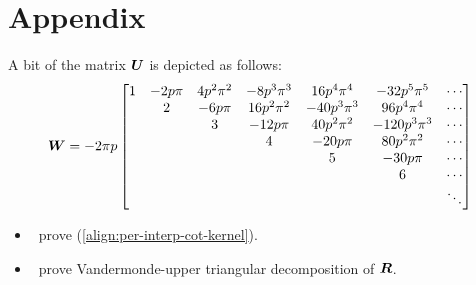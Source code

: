 \section{Appendix}

A bit of the matrix $\boldsymbol{U}$ is depicted as follows:
\begin{align}
  \label{eq:some-of-U}
  \boldsymbol{W} = -2\pi{}p \begin{bmatrix}
    1 & -2 p \pi  & 4 p^2 \pi ^2 & -8 p^3 \pi ^3 & 16 p^4 \pi ^4 & -32 p^5 \pi ^5 & \cdots \\
    & 2 & -6 p \pi  & 16 p^2 \pi ^2 & -40 p^3 \pi ^3 & 96 p^4 \pi ^4 & \cdots \\
    & & 3 & -12 p \pi  & 40 p^2 \pi ^2 & -120 p^3 \pi ^3 & \cdots \\
    & & & 4 & -20 p \pi  & 80 p^2 \pi ^2 & \cdots \\
    & & & & 5 & -30 p \pi & \cdots \\
    & & & & & 6 & \cdots \\
    & & & & & & \ddots
  \end{bmatrix}
\end{align}

\begin{itemize}
\item \TODO\ prove (\ref{align:per-interp-cot-kernel}).
\item \TODO\ prove Vandermonde-upper triangular decomposition of
  $\boldsymbol{R}$.
\end{itemize}

